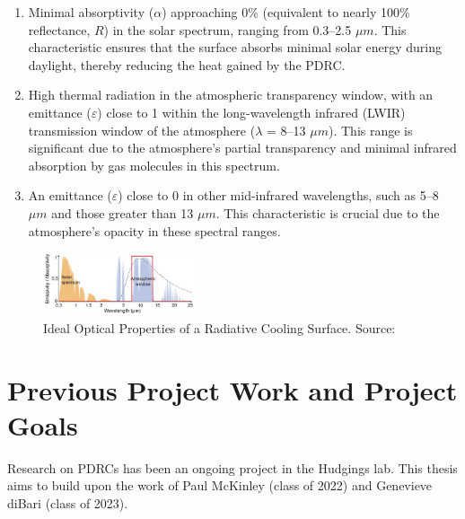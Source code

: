 \begin{enumerate} 
\item Minimal absorptivity ($\alpha$) approaching 0\% (equivalent to nearly 100\% reflectance, $R$) in the solar spectrum, ranging from 0.3–2.5 $\mu m$. This characteristic ensures that the surface absorbs minimal solar energy during daylight, thereby reducing the heat gained by the PDRC.
\item High thermal radiation in the atmospheric transparency window, with an emittance ($\varepsilon$) close to 1 within the long-wavelength infrared (LWIR) transmission window of the atmosphere ($\lambda$ = 8–13 $\mu m$). This range is significant due to the atmosphere's partial transparency and minimal infrared absorption by gas molecules in this spectrum.
\item An emittance ($\varepsilon$) close to 0 in other mid-infrared wavelengths, such as 5–8 $\mu m$ and those greater than 13 $\mu m$. This characteristic is crucial due to the atmosphere's opacity in these spectral ranges.
\end{enumerate}

\begin{figure}[ht!]
  \centering
  \includegraphics[width=0.4\textwidth]{Chapters/Figures/Ideal Optical Properties of a Radiative Cooling Surface.jpg}
  \caption[Ideal Optical Properties of a Radiative Cooling Surface]{Ideal Optical Properties of a Radiative Cooling Surface. Source: \cite{yang_passive_2020}}
  \label{fig:ideal_PDRC_properties}
\end{figure}



\section{Previous Project Work and Project Goals}
Research on PDRCs has been an ongoing project in the Hudgings lab. This thesis aims to build upon the work of Paul McKinley (class of 2022) and Genevieve diBari (class of 2023).

